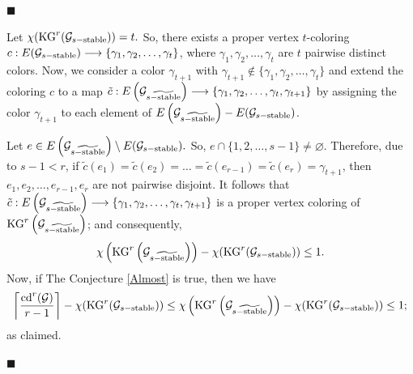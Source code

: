 \documentclass[11pt]{article}
\begin{document}
    \hfill{$\blacksquare$}
    


    Let $\chi ({\rm KG}^r ({\cal G}_{s-{\rm stable}})) = t.$
    So, there exists a proper vertex $t$-coloring
    $c: E({\cal G}_{s-{\rm stable}}) \longrightarrow \{\gamma_{1}, \gamma_{2}, \dots , \gamma_{t}\}$, where $\gamma_{1}, \gamma_{2}, \dots , \gamma_{t}$ are $t$ pairwise distinct colors.
    Now, we consider a color $\gamma_{t+1}$ with $\gamma_{t+1} \notin \{\gamma_{1}, \gamma_{2}, \dots , \gamma_{t}\}$
    and extend the coloring $c$ to a map
    $\tilde{c} : E \left( {\cal G}_{     \widetilde{{s-  {\rm stable}   }}     } \right)  \longrightarrow \{\gamma_{1}, \gamma_{2}, \dots , \gamma_{t} , \gamma_{t+1}\}$ by assigning the color $\gamma_{t+1}$ to each element of
    $E \left( {\cal G}_{     \widetilde{{s-  {\rm stable}   }}     } \right)
    - E ({\cal G}_{s-{\rm stable}}) $.
    
    \noindent Let
    $e \in E \left( {\cal G}_{     \widetilde{{s-  {\rm stable}   }}     } \right)
    \setminus E ({\cal G}_{s-{\rm stable}}) .$ So, $e \cap \{1 , 2 , \dots , s-1\} \neq \varnothing.$ Therefore, due to $s-1 < r$, if
    $\tilde{c} (e_1) = \tilde{c} (e_2) = \dots = \tilde{c} (e_{r-1}) = \tilde{c} (e_{r}) = \gamma_{t+1}$, then $e_{1} , e_{2} , \dots , e_{r-1} , e_{r}$ are not pairwise
    disjoint. It follows that
    $\tilde{c} : E \left( {\cal G}_{     \widetilde{{s-  {\rm stable}   }}     } \right)  \longrightarrow \{\gamma_{1}, \gamma_{2}, \dots , \gamma_{t} , \gamma_{t+1}\}$
    is a proper vertex coloring of
    ${\rm KG}^r \left( {\cal G}_{     \widetilde{{s-  {\rm stable}   }}     } \right)$;
    and consequently,
    $$\chi \left(       {\rm KG}^r \left( {\cal G}_{     \widetilde{{s-  {\rm stable}   }}     } \right)         \right)      -  \chi ({\rm KG}^r ({\cal G}_{s-{\rm stable}})) \leq 1.    
    $$
    Now, if The Conjecture \ref{Almost} is true, then we have    
    $$\left\lceil  \frac{{\rm cd}^r ({\cal G})}{r-1}   \right\rceil      -  \chi ({\rm KG}^r ({\cal G}_{s-{\rm stable}})) \leq    
    \chi \left(       {\rm KG}^r \left( {\cal G}_{     \widetilde{{s-  {\rm stable}   }}     } \right)         \right)      -  \chi ({\rm KG}^r ({\cal G}_{s-{\rm stable}})) \leq 1;    
    $$
    as claimed.

\hfill{$\blacksquare$}
\end{document}
